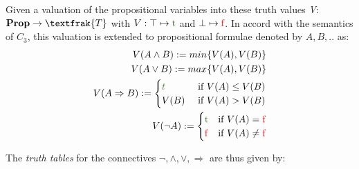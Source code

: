 				Given a valuation of the propositional variables into these truth values \emph{V}: $\textbf{Prop}\rightarrow \textfrak{T}$ with $V: \top \mapsto \text{\textcolor{OliveGreen}{t}} $ and $\bot \mapsto \text{\textcolor{red}{f}}$. \newline
				In accord with the semantics of $C_3$, this valuation is extended to propositional formulae denoted by $A,B,..$ as:
				\begin{align*}
					V(A \land B) := min\{ V(A), V(B) \} \\
					V(A \lor B) := max\{ V(A), V(B) \} \\
					V(A \Rightarrow B) :=
					\begin{cases}
						\textcolor{OliveGreen}{t} & \text{	if	}  V(A) \leq V(B) \\
						V(B) & \text{	if	} V(A)>V(B)\\
					\end{cases}  \\
					V(\neg A) :=\begin{cases}
						\text{\textcolor{OliveGreen}{t}} &	\text{if }V(A) = \text{\textcolor{red}{f}} \\
						\text{\textcolor{red}{f}} & \text{if }V(A) \neq \text{\textcolor{red}{f}}\\
					\end{cases}        
				\end{align*}

				The \emph{truth tables} for the connectives $\neg, \land, \lor, \Rightarrow$  are thus given by:
				
